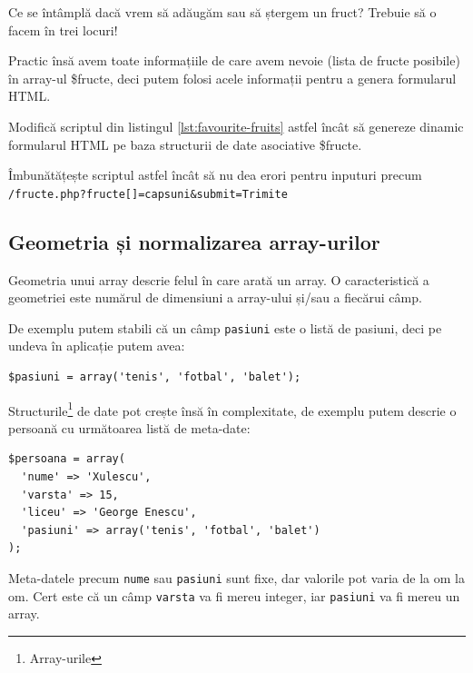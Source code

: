 Ce se întâmplă dacă vrem să adăugăm sau
să ștergem un fruct? Trebuie să o facem în trei locuri!

Practic însă avem toate informațiile de care avem nevoie (lista de fructe posibile) în array-ul \$fructe,
deci putem folosi acele informații pentru a genera formularul HTML.

\begin{Exercise}[title={Structuri de date abstracte},difficulty=1]
Modifică scriptul din listingul \ref{lst:favourite-fruits} astfel încât să genereze dinamic
formularul HTML pe baza structurii de date asociative \$fructe.

Îmbunătățește scriptul astfel încât să nu dea erori pentru inputuri precum\\
\texttt{/fructe.php?fructe[]=capsuni\&submit=Trimite}
\end{Exercise}


\subsection{Geometria și normalizarea array-urilor}
Geometria unui array descrie felul în care arată un array. O caracteristică
a geometriei este numărul de dimensiuni a array-ului și/sau a fiecărui câmp.

De exemplu putem stabili că un câmp \texttt{pasiuni} este o listă de pasiuni,
deci pe undeva în aplicație putem avea:
\begin{lstlisting}
$pasiuni = array('tenis', 'fotbal', 'balet');
\end{lstlisting}

Structurile\footnote{Array-urile} de date pot crește însă în complexitate, de
exemplu putem descrie o persoană cu următoarea listă de meta-date:
\begin{lstlisting}
$persoana = array(
  'nume' => 'Xulescu',
  'varsta' => 15,
  'liceu' => 'George Enescu',
  'pasiuni' => array('tenis', 'fotbal', 'balet')
);
\end{lstlisting}
Meta-datele precum \texttt{nume} sau \texttt{pasiuni} sunt fixe, dar valorile
pot varia de la om la om. Cert este că un câmp \texttt{varsta} va fi mereu
integer, iar \texttt{pasiuni} va fi mereu un array.

